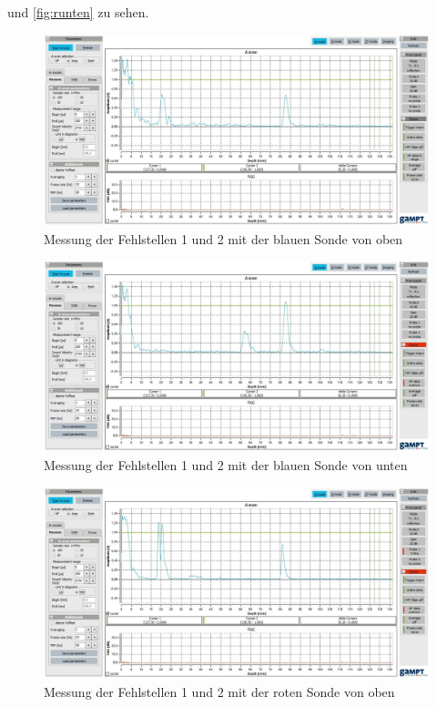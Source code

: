 und \ref{fig:runten} zu sehen.
\begin{figure}[H]
\centering
\includegraphics[width=\textwidth]{12a.jpg}
\caption{Messung der Fehlstellen 1 und 2 mit der blauen Sonde von oben}
\label{fig:boben}
\end{figure}

\begin{figure}[H]
\centering
\includegraphics[width=\textwidth]{12blauunten.jpg}
\caption{Messung der Fehlstellen 1 und 2 mit der blauen Sonde von unten}
\label{fig:bunten}
\end{figure}

\begin{figure}[H]
\centering
\includegraphics[width=\textwidth]{12rotoben.jpg}
\caption{Messung der Fehlstellen 1 und 2 mit der roten Sonde von oben}
\label{fig:roben}
\end{figure}

